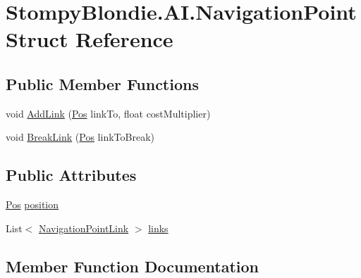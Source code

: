 \hypertarget{struct_stompy_blondie_1_1_a_i_1_1_navigation_point}{}\section{Stompy\+Blondie.\+A\+I.\+Navigation\+Point Struct Reference}
\label{struct_stompy_blondie_1_1_a_i_1_1_navigation_point}
\subsection*{Public Member Functions}
\begin{DoxyCompactItemize}
\item 
void \mbox{\hyperlink{struct_stompy_blondie_1_1_a_i_1_1_navigation_point_abc0e08ae4c5adba28a1cdc2d8582498f}{Add\+Link}} (\mbox{\hyperlink{struct_stompy_blondie_1_1_common_1_1_types_1_1_pos}{Pos}} link\+To, float cost\+Multiplier)
\item 
void \mbox{\hyperlink{struct_stompy_blondie_1_1_a_i_1_1_navigation_point_a64ecccc4561cfa8073b2afbd6fa1bacf}{Break\+Link}} (\mbox{\hyperlink{struct_stompy_blondie_1_1_common_1_1_types_1_1_pos}{Pos}} link\+To\+Break)
\end{DoxyCompactItemize}
\subsection*{Public Attributes}
\begin{DoxyCompactItemize}
\item 
\mbox{\hyperlink{struct_stompy_blondie_1_1_common_1_1_types_1_1_pos}{Pos}} \mbox{\hyperlink{struct_stompy_blondie_1_1_a_i_1_1_navigation_point_a7a6c1f4bdf3a03b0ce91841e757a55c6}{position}}
\item 
List$<$ \mbox{\hyperlink{struct_stompy_blondie_1_1_a_i_1_1_navigation_point_link}{Navigation\+Point\+Link}} $>$ \mbox{\hyperlink{struct_stompy_blondie_1_1_a_i_1_1_navigation_point_a66d3f456267553476dfc34c0ebf9f9e2}{links}}
\end{DoxyCompactItemize}


\subsection{Member Function Documentation}
\mbox{\label{struct_stompy_blondie_1_1_a_i_1_1_navigation_point_abc0e08ae4c5adba28a1cdc2d8582498f}} 
